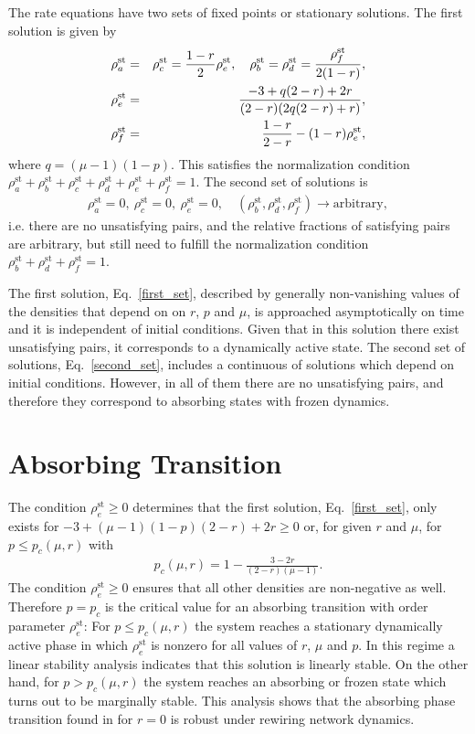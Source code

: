 \documentclass[aps,pre,notitlepage]{revtex4-1}
\begin{document}
The rate equations have two sets of fixed points or stationary solutions. The first solution is given by
\begin{eqnarray} \label{first_set}
\rho_{a}^\text{st}&=&\rho_{c}^\text{st}=\frac{1-r}{2}\rho_{e}^\text{st}, \quad
\rho_{b}^\text{st}=\rho_{d}^\text{st}=\frac{\rho_{f}^\text{st}}{2(1-r)},\cr
\rho_{e}^\text{st}&=&\frac{-3+q(2-r)+2r}{(2-r)(2q(2-r)+r)},\cr
\rho_{f}^\text{st}&=&\frac{1-r}{2-r}-(1-r)\rho_{e}^\text{st},
\end{eqnarray}
where $q=(\mu-1)(1-p)$. This satisfies the normalization condition $\rho^\text{st}_a+\rho^\text{st}_b+\rho^\text{st}_c+\rho^\text{st}_d+\rho^\text{st}_e+\rho^\text{st}_f=1$. The second set of solutions is
\begin{eqnarray}
\rho_{a}^\text{st}= 0, \ \rho_{c}^\text{st}= 0, \ \rho_{e}^\text{st}=0, \quad (\rho^\text{st}_{b},\rho^\text{st}_{d},\rho^\text{st}_{f}) \rightarrow \textrm{arbitrary}, \label{second_set}
\end{eqnarray}
i.e. there are no unsatisfying pairs, and the relative fractions of satisfying pairs are arbitrary, but still need to fulfill the normalization condition $\rho^\text{st}_b+\rho^\text{st}_d+\rho^\text{st}_f=1$.

The first solution, Eq.~\eqref{first_set}, described by generally non-vanishing values of the densities that depend on on $r$, $p$ and $\mu$, is approached asymptotically on time and it is independent of initial conditions. Given that in this solution there exist unsatisfying pairs, it corresponds to a dynamically active state. The second set of solutions, Eq.~\eqref{second_set}, includes a continuous of solutions which depend on initial conditions. However, in all of them there are no unsatisfying pairs, and therefore they correspond to absorbing states with frozen dynamics.

\section*{Absorbing Transition}

The condition $\rho^\text{st}_e\ge0$ determines that the first solution, Eq.~\eqref{first_set}, only exists for $-3+(\mu-1)(1-p)(2-r)+2r\ge0$ or, for given $r$ and $\mu$, for $p\le p_{c}(\mu,r)$ with
\begin{eqnarray}\label{eq:pc}
p_{c}(\mu,r)=1-\frac{3-2r}{(2-r)(\mu-1)}.
\end{eqnarray}
The condition $\rho^\text{st}_e\ge0$ ensures that all other densities are non-negative as well. Therefore $p=p_{c}$ is the critical value for an absorbing transition with order parameter $\rho^\text{st}_e$: For $p\le p_{c}(\mu,r)$ the system reaches a stationary dynamically active phase in which $\rho_e^\text{st}$ is nonzero for all values of $r$, $\mu$ and $p$. In this regime a linear stability analysis indicates that this solution is linearly stable. On the other hand, for $p > p_{c}(\mu,r)$ the system reaches an absorbing or frozen state which turns out to be marginally stable. This analysis shows that the absorbing phase transition found in \cite{saeedian2019absorbing} for $r=0$ is robust under rewiring network dynamics.
\end{document}
